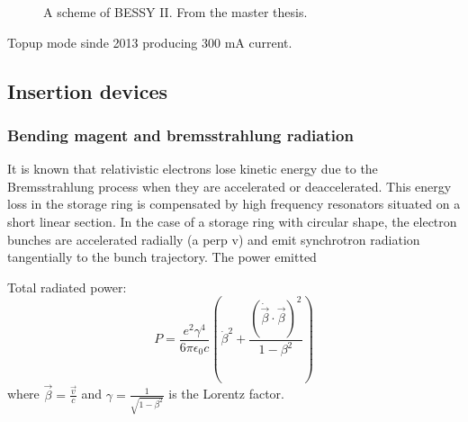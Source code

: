 \begin{figure}%
	\centering
		\caption{A scheme of BESSY II. From the master thesis.}
		\label{fig:BessyScheme}
\end{figure}

Topup mode sinde 2013 producing 300 mA current.

\subsection{Insertion devices}

\subsubsection{Bending magent and bremsstrahlung radiation}
It is known that relativistic electrons lose kinetic energy due to the Bremsstrahlung process\citep{blumenthal_bremsstrahlung_1970} when they are accelerated or deaccelerated. This energy loss in the storage ring is compensated by high frequency resonators situated on a short linear section. In the case of a storage ring with circular shape, the electron bunches are accelerated radially (a perp v) and emit synchrotron radiation tangentially to the bunch trajectory. The power emitted


Total radiated power:
\begin{equation}
        P=\frac{e^2\gamma^4}{6\pi\epsilon_0c}\left( \dot{\beta}^2 + \frac{(\dot{\vec{\beta}} \cdot \vec{\beta})^2}{1-\beta^2} \right)
\end{equation}
where $\vec{\beta}=\frac{\vec{v}}{c}$ and $\gamma=\frac{1}{\sqrt{1-\beta^2}}$ is the Lorentz factor.

